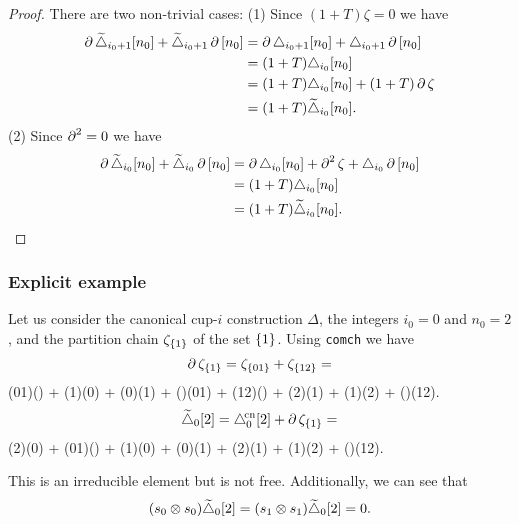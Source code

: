 \begin{proof}
	There are two non-trivial cases:
	(1) Since $(1+T) \zeta = 0$ we have
	\begin{align*}
		\operatorname{\partial} \widetilde\triangle_{i_0+1}[n_0] + \widetilde\triangle_{i_0+1} \operatorname{\partial} \,[n_0] &=
		\operatorname{\partial} \triangle_{i_0+1}[n_0] + \triangle_{i_0+1} \operatorname{\partial} \,[n_0] \\ &=
		(1+T)\triangle_{i_0}[n_0] \\ &=
		(1+T)\triangle_{i_0}[n_0] + (1+T) \operatorname{\partial} \zeta \\ &=
		(1+T)\widetilde\triangle_{i_0}[n_0] .
	\end{align*}
	(2) Since $\operatorname{\partial}^2 = 0$ we have
	\begin{align*}
		\operatorname{\partial} \widetilde\triangle_{i_0}[n_0] + \widetilde\triangle_{i_0} \operatorname{\partial} \,[n_0] &=
		\operatorname{\partial} \triangle_{i_0}[n_0] + \operatorname{\partial}^2 \zeta + \triangle_{i_0} \operatorname{\partial} \,[n_0] \\ &=
		(1+T)\triangle_{i_0}[n_0] \\ &=
		(1+T)\widetilde\triangle_{i_0}[n_0]. \qedhere
	\end{align*}
\end{proof}

\subsubsection{Explicit example}

Let us consider the canonical \mbox{cup-$i$} construction $\Delta$, the integers $i_0 = 0$ and $n_0 = 2$, and the partition chain $\zeta_{\{1\}}$ of the set $\{1\}$.
Using \texttt{comch} we have
\[
\operatorname{\partial} \zeta_{\{1\}} = \zeta_{\{01\}} + \zeta_{\{12\}} =
\]
\noindent
{\ttfamily (01)() + (1)(0) + (0)(1) + ()(01) + (12)() + (2)(1) + (1)(2) + ()(12).}
\[
\widetilde\triangle_0[2] = \triangle^{\!\mathrm{cn}}_0[2] + \operatorname{\partial} \zeta_{\{1\}} =
\]
\noindent
{\ttfamily (2)(0) + (01)() + (1)(0) + (0)(1) + (2)(1) + (1)(2) + ()(12)}.

\medskip \noindent This is an irreducible element but is not free.
Additionally, we can see that
\[
(s_0 \otimes s_0)\widetilde\triangle_0[2] = (s_1 \otimes s_1)\widetilde\triangle_0[2] = 0.
\]
